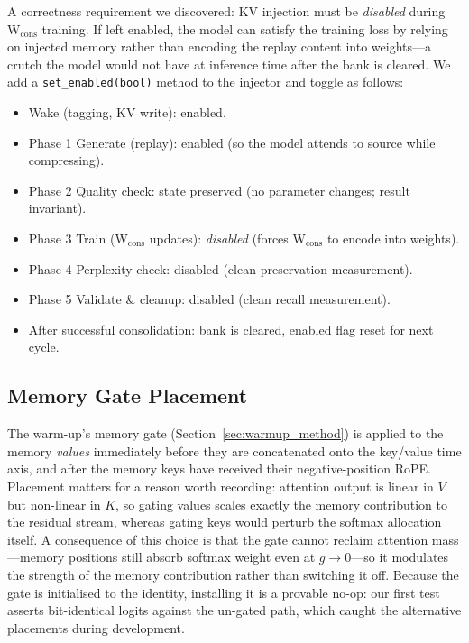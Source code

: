 A correctness requirement we discovered: KV injection must be \emph{disabled} during W$_\mathrm{cons}$ training. If left enabled, the model can satisfy the training loss by relying on injected memory rather than encoding the replay content into weights---a crutch the model would not have at inference time after the bank is cleared. We add a \texttt{set\_enabled(bool)} method to the injector and toggle as follows:

\begin{itemize}[itemsep=0.1em,topsep=0.2em]
    \item Wake (tagging, KV write): enabled.
    \item Phase 1 Generate (replay): enabled (so the model attends to source while compressing).
    \item Phase 2 Quality check: state preserved (no parameter changes; result invariant).
    \item Phase 3 Train (W$_\mathrm{cons}$ updates): \emph{disabled} (forces W$_\mathrm{cons}$ to encode into weights).
    \item Phase 4 Perplexity check: disabled (clean preservation measurement).
    \item Phase 5 Validate \& cleanup: disabled (clean recall measurement).
    \item After successful consolidation: bank is cleared, enabled flag reset for next cycle.
\end{itemize}

\subsection{Memory Gate Placement}

The warm-up's memory gate (Section~\ref{sec:warmup_method}) is applied to the memory \emph{values} immediately before they are concatenated onto the key/value time axis, and after the memory keys have received their negative-position RoPE. Placement matters for a reason worth recording: attention output is linear in $V$ but non-linear in $K$, so gating values scales exactly the memory contribution to the residual stream, whereas gating keys would perturb the softmax allocation itself. A consequence of this choice is that the gate cannot reclaim attention mass---memory positions still absorb softmax weight even at $g \to 0$---so it modulates the strength of the memory contribution rather than switching it off. Because the gate is initialised to the identity, installing it is a provable no-op: our first test asserts bit-identical logits against the un-gated path, which caught the alternative placements during development.

